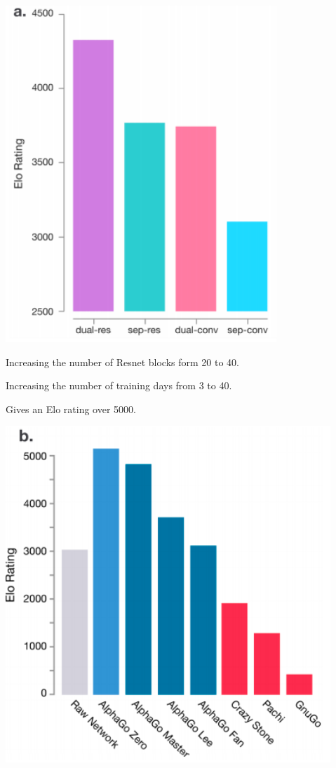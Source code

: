 {

\centerline{\includegraphics[height = 5in]{../images/alphaablation}}



Increasing the number of Resnet blocks form 20 to 40.

\vfill
Increasing the number of training days from 3 to 40.

\vfill
Gives an Elo rating over 5000.


\centerline{\includegraphics[height = 5in]{../images/alpha40}}

}
